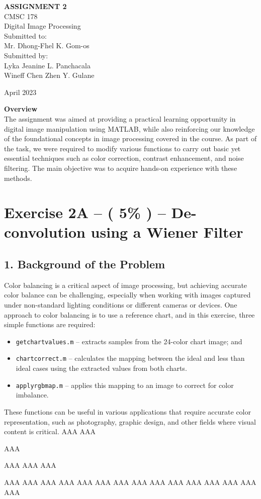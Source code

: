 \documentclass{article}
\newcommand{\mytitlepage}{
    \begin{titlepage}
        \begin{center}
            \vspace*{1.5cm}
            
            \LARGE\textbf{ASSIGNMENT 2}
            \vspace{0.5cm}\\
            \Large CMSC 178\\
            \Large Digital Image Processing\\
            \vspace{3cm}
            Submitted to:\\
            Mr. Dhong-Fhel K. Gom-os\\
            
            \vspace{2.5cm}
            Submitted by:\\
            Lyka Jeanine L. Panchacala\\
            Wineff Chen Zhen Y. Gulane
            
            \vspace{4cm}
            
	April 2023
            
            \vspace{1.3cm}
        \end{center}
        \large\textbf{Overview}\\
        The assignment was aimed at providing a practical learning opportunity in digital image manipulation using MATLAB, while also reinforcing our knowledge of the foundational concepts in image processing covered in the course. As part of the task, we were required to modify various functions to carry out basic yet essential techniques such as color correction, contrast enhancement, and noise filtering. The main objective was to acquire hands-on experience with these methods.
    \end{titlepage}
}
\begin{document}
	\mytitlepage

	\newpage
	\section*{Exercise 2A –  ( 5\% ) – De-convolution using a Wiener Filter}
	
	\subsection*{1. Background of the Problem}
	Color balancing is a critical aspect of image processing, but achieving accurate color balance can be challenging, especially when working with images captured under non-standard lighting conditions or different cameras or devices. One approach to color balancing is to use a reference chart, and in this exercise, three simple functions are required:
	\begin{itemize}
	\item {\texttt{get\textunderscore chart\textunderscore values.m}} – extracts samples from the 24-color chart image; and 
	\item {\texttt{chart\textunderscore correct.m}}  – calculates the mapping between the ideal and less than ideal cases using the extracted values from both charts. 
	\item {\texttt{apply\textunderscore rgb\textunderscore map.m}} –  applies this mapping to an image to correct for color imbalance.
	\end{itemize}
 These functions can be useful in various applications that require accurate color representation, such as photography, graphic design, and other fields where visual content is critical.
 AAA
 AAA

 AAA

 AAA
 AAA
 AAA
 
 AAA
 AAA
 AAA
 AAA
 AAA
 AAA
 AAA
 AAA
 AAA
 AAA
 AAA
 AAA
 AAA
 AAA
 AAA
 
\end{document}
